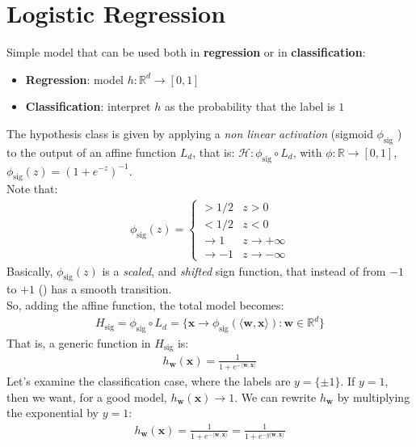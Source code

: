 \documentclass[../template.tex]{subfiles}
\begin{document}
\section{Logistic Regression}
Simple model that can be used both in \textbf{regression} or in \textbf{classification}:
\begin{itemize}
    \item \textbf{Regression}: model $h\colon \mathbb{R}^d \to [0,1]$
    \item \textbf{Classification}: interpret $h$ as the probability that the label is $1$     
\end{itemize}  
The hypothesis class is given by applying a \textit{non linear activation} (sigmoid $\phi_{\mathrm{sig} }$ ) to the output of an affine function $L_d$, that is: $\mathcal{H}\colon \phi_{\mathrm{sig} } \circ L_d$, with $\phi\colon \mathbb{R} \to [0,1]$, $\phi_{\mathrm{sig} }(z) = (1+e^{-z})^{-1}$.\\
Note that:
\begin{align*}
    \phi_{\mathrm{sig} }(z) = \begin{cases}
        > 1/2 & z > 0\\
        < 1/2 & z < 0\\
        \to 1 & z \to +\infty\\
        \to -1 & z \to -\infty
    \end{cases}
\end{align*}      
Basically, $\phi_{\mathrm{sig} }(z)$ is a \textit{scaled}, and \textit{shifted}  sign function, that instead of  from $-1$ to $+1$ () has a smooth transition.\\
So, adding the affine function, the total model becomes:
\begin{align*}
    H_{\mathrm{sig} } = \phi_{\mathrm{sig} } \circ L_d = \{ \bm{x} \to \phi_{\mathrm{sig} }(\langle \bm{w}, \bm{x} \rangle) \colon \bm{w} \in \mathbb{R}^d \}
\end{align*}
That is, a generic function in $H_{\mathrm{sig}}$ is:
\begin{align*}
    h_{\bm{w}}(\bm{x}) = \frac{1}{1 + e^{-\langle \bm{w}, \bm{x} \rangle}} 
\end{align*} 
Let's examine the classification case, where the labels are $y = \{ \pm 1\}$. If $y = 1$, then we want, for a good model, $h_{\bm{w}}(\bm{x}) \to 1$. We can rewrite $h_{\bm{w}}$ by multiplying the exponential by $y = 1$:
\begin{align*}
    h_{\bm{w}}(\bm{x}) = \frac{1}{1+ e^{-\langle \bm{w}, \bm{x} \rangle}} = \frac{1}{1 + e^{-y \langle \bm{w}, \bm{x} \rangle}}  
\end{align*}
\end{document}
